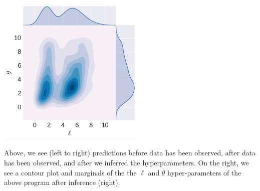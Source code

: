 \documentclass[a0,portrait]{a0poster}
\begin{document}
\begin{multicols}{3}
\begin{center}
\end{center}




\begin{table} %
\begin{center}
\includegraphics[width=7cm]{neal_contour_l_vs_sf_s__marginal_after.png} 
\end{center}
\end{table}
 Above, we see (left to right) predictions before data has been observed, after data has been observed, and after we inferred the hyperparameters. On the right, we see a contour plot and marginals of the the $\ell$ and $\theta$ hyper-parameters of the above program after inference (right).

\vfill
\columnbreak



\end{multicols}
\end{document}
